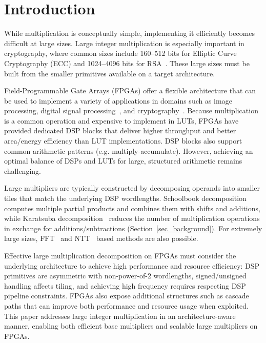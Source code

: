\documentclass[conference]{IEEEtran}
\begin{document}

% 
\section{Introduction}
While multiplication is conceptually simple, implementing it efficiently becomes difficult at large sizes.
Large integer multiplication is especially important in cryptography, where common sizes include 160--512 bits for Elliptic Curve Cryptography (ECC) and 1024--4096 bits for RSA~\cite{patelComparisonKeySize2023}.
These large sizes must be built from the smaller primitives available on a target architecture.

Field-Programmable Gate Arrays (FPGAs) offer a flexible architecture that can be used to implement a variety of applications in domains such as image processing,  digital signal processing~\cite{sarrafzadehImageRestorationFPGA2003}, and cryptography~\cite{prasannaFHEPerformanceModelingFPGA2021}.
Because multiplication is a common operation and expensive to implement in LUTs, FPGAs have provided dedicated DSP blocks that deliver higher throughput and better area/energy efficiency than LUT implementations.
DSP blocks also support common arithmetic patterns (e.g. multiply-accumulate). However, achieving an optimal balance of DSPs and LUTs for large, structured arithmetic remains challenging.

Large multipliers are typically constructed by decomposing operands into smaller tiles that match the underlying DSP wordlengths.
Schoolbook decomposition computes multiple partial products and combines them with shifts and additions, while Karatsuba decomposition~\cite{karatsubaOriginalPaper} reduces the number of multiplication operations in exchange for additions/subtractions (Section~\ref{sec_background}).
For extremely large sizes, FFT~\cite{yapFFTquickmul2000} and NTT~\cite{weemsNTTHighPrecisionInteger2011} based methods are also possible.

Effective large multiplication decomposition on FPGAs must consider the underlying architecture to achieve high performance and resource efficiency: DSP primitives are asymmetric with non-power-of-2 wordlengths, signed/unsigned handling affects tiling, and achieving high frequency requires respecting DSP pipeline constraints.
FPGAs also expose additional structures such as cascade paths that can improve both performance and resource usage when exploited.
This paper addresses large integer multiplication in an architecture-aware manner, enabling both efficient base multipliers and scalable large multipliers on FPGAs.
\end{document}
